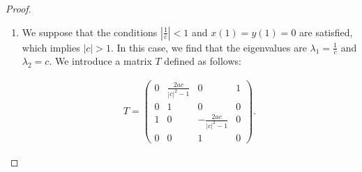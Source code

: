 \documentclass{amsart}
\theoremstyle{definition}
\theoremstyle{remark}
\begin{document}
\begin{proof}
\begin{enumerate}
    and we compute the \(l^2\)-norm of \(T^{-1} \psi\) as:

    \begin{align*}
    \| T^{-1} \psi \|^2 = \sum_{n \in \mathbb{N}} \left( |c|^{2n} \big( |x(n)|^2 + |y(n)|^2 \big) + \left| \frac{1}{\bar{c}} \right|^{2n} \big( |z(n)|^2 + |w(n)|^2 \big) \right).
    \end{align*}

    Since \(|\lambda_1| |\lambda_2| = 1\) and \(|c| < 1\), we conclude that \(\| T^{-1} \psi \|^2 < \infty\) holds if and only if either \(z(1) = w(1) = 0\) or both \(x(1) = y(1) = 0\) and \(\left| \frac{1}{\bar{c}} \right| < 1\).

    \begin{enumerate}
        \item We suppose that \(z(1) = w(1) = 0\) holds. Since \(w(1) = w \frac{2a}{|c|^2 - 1} = 0\), we deduce that either \(w = 0\) or \(a = 0\). Therefore, we determine that the kernel of \(H^\# - E\) is:

        \begin{align*}
        \ker(H^\# - E) =
        \begin{cases}
        \langle e_1 \rangle & \text{if } a \neq 0, \\
        \langle e_1, e_4 \rangle & \text{if } a = 0.
        \end{cases}
        \end{align*}

        \item We suppose that \(\left| \frac{1}{\bar{c}} \right| < 1\) and \(x(1) = y(1) = 0\) hold. Since \(\left| \frac{1}{\bar{c}} \right| < 1\) implies \(|c| > 1\), we recognize that this contradicts the assumption \(|c| < 1\) in this case.
    \end{enumerate}

    \item We suppose that the conditions \(\left| \frac{1}{\bar{c}} \right| < 1\) and \(x(1) = y(1) = 0\) are satisfied, which implies \(|c| > 1\). In this case, we find that the eigenvalues are \(\lambda_1 = \frac{1}{\bar{c}}\) and \(\lambda_2 = c\). We introduce a matrix \(T\) defined as follows:

    \begin{align*}
    T = \begin{pmatrix}
    0 & \frac{2a c}{|c|^2 - 1} & 0 & 1 \\
    0 & 1 & 0 & 0 \\
    1 & 0 & -\frac{2a c}{|c|^2 - 1} & 0 \\
    0 & 0 & 1 & 0
    \end{pmatrix}.
    \end{align*}


\end{enumerate}
\end{proof}
\end{document}
